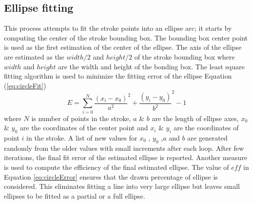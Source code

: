 \documentclass[preprint,10pt,5p,twocolumn]{elsarticle}
\begin{document}

\subsection{Ellipse fitting}
This process attempts to fit the stroke points into an ellipse arc; it starts by computing the center of the stroke bounding box. The bounding box center point is used as the first estimation of the center of the ellipse. The axis of the ellipse are estimated as the $width/2$ and $height/2$ of the stroke bounding box where $width$ and $height$ are the width and height of the bonding box. The least square fitting algorithm \cite{chernov} is used to minimize the fitting error of the ellipse Equation (\ref{eq:circleFit})  
\begin{equation}
E = \sum\limits_{i = 0}^N {\frac{{(x_i - x_0 )}}{{a^2 }}^2  + \frac{{(y_i - y_0 )}}{{b^2 }}^2  - 1} 
\label{eq:circleFit}
\end{equation}
where $N$ is number of points in the stroke, $a$ \& $b$ are the length of ellipse axes, $x_0$ \& $y_0$ are the coordinates of the center point and $x_i$ \& $y_i$ are the coordinates of point $i$ in the stroke. A list of new values for $x_0$ , $y_0$ ,$a$ and $b$ are generated randomly from the older values with small increments after each loop.  After few iterations, the final fit error of the estimated ellipse is reported. Another measure is used to compute the efficiency of the final estimated ellipse. The value of $eff$ in Equation \ref{eq:circleError} ensures that the drawn percentage of ellipse is considered. This eliminates fitting a line into very large ellipse but leaves small ellipses to be fitted as a partial or a full ellipse. 
\end{document}
